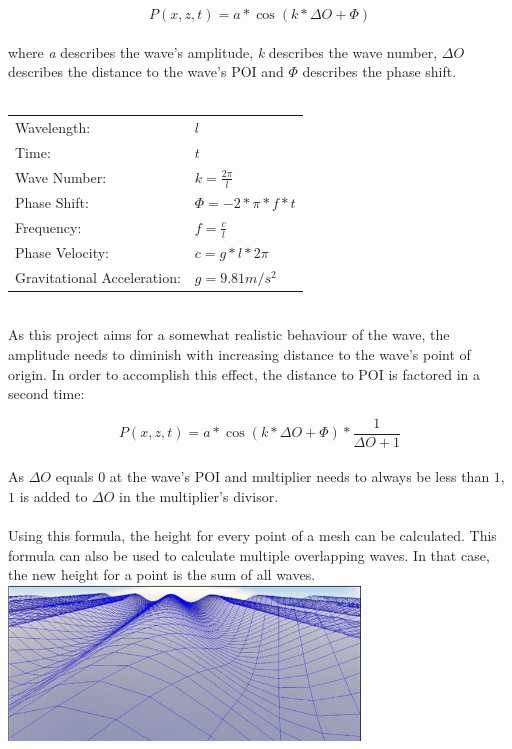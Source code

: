 \documentclass[12pt,a4paper]{scrartcl}
\begin{document}
$$P(x,z,t) = a * \cos(k * {\Delta}O + \Phi) $$
\ \\
where \textit{a} describes the wave's amplitude, \textit{k} describes the wave number, ${\Delta}O$ describes the distance to the wave's POI and $\Phi$ describes the phase shift.\\
\ \\
\begin{center}
	\begin{tabular}{ll}
		Wavelength: & $l$ \\
		Time: & $t$ \\
		Wave Number: & $k = \frac{2\pi}{l}$ \\
		Phase Shift: & $\Phi = -2 * \pi * f * t$ \\
		Frequency: & $f = \frac{c}{l}$ \\
		Phase Velocity: & $c = g * l * 2\pi$ \\
		Gravitational Acceleration: & $g = 9.81 m/s^2$
	\end{tabular}
\end{center}
\ \\
As this project aims for a somewhat realistic behaviour of the wave, the amplitude needs to diminish with increasing distance to the wave's point of origin. In order to accomplish this effect, the distance to POI is factored in a second time:

$$P(x,z,t) = a * \cos(k * {\Delta}O + \Phi) * \frac{1}{{\Delta}O+1} $$
\ \\
As ${\Delta}O$ equals $0$ at the wave's POI and multiplier needs to always be less than $1$, $1$ is added to ${\Delta}O$ in the multiplier's divisor.\\
\ \\
Using this formula, the height for every point of a mesh can be calculated. This formula can also be used to calculate multiple overlapping waves. In that case, the new height for a point is the sum of all waves.\\

\includegraphics[width=0.7\textwidth]{Images/SinWaves.jpg}
\end{document}
